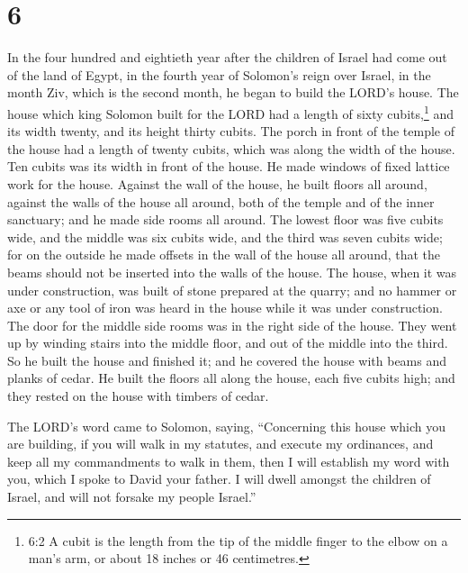 \hypertarget{section-5}{%
\section{6}\label{section-5}}

 In the four hundred and eightieth year after the children
of Israel had come out of the land of Egypt, in the fourth year of
Solomon's reign over Israel, in the month Ziv, which is the second
month, he began to build the LORD's house.  The house which
king Solomon built for the LORD had a length of sixty cubits,\footnote{6:2
  A cubit is the length from the tip of the middle finger to the elbow
  on a man's arm, or about 18 inches or 46 centimetres.} and its width
twenty, and its height thirty cubits.  The porch in front of
the temple of the house had a length of twenty cubits, which was along
the width of the house. Ten cubits was its width in front of the house.
 He made windows of fixed lattice work for the house.
 Against the wall of the house, he built floors all around,
against the walls of the house all around, both of the temple and of the
inner sanctuary; and he made side rooms all around.  The
lowest floor was five cubits wide, and the middle was six cubits wide,
and the third was seven cubits wide; for on the outside he made offsets
in the wall of the house all around, that the beams should not be
inserted into the walls of the house.  The house, when it
was under construction, was built of stone prepared at the quarry; and
no hammer or axe or any tool of iron was heard in the house while it was
under construction.  The door for the middle side rooms was
in the right side of the house. They went up by winding stairs into the
middle floor, and out of the middle into the third.  So he
built the house and finished it; and he covered the house with beams and
planks of cedar.  He built the floors all along the house,
each five cubits high; and they rested on the house with timbers of
cedar.

 The LORD's word came to Solomon, saying, 
``Concerning this house which you are building, if you will walk in my
statutes, and execute my ordinances, and keep all my commandments to
walk in them, then I will establish my word with you, which I spoke to
David your father.  I will dwell amongst the children of
Israel, and will not forsake my people Israel.''

